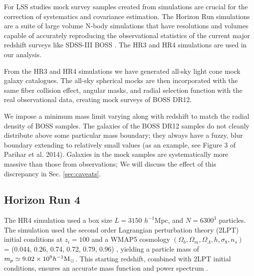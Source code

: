 \documentclass[iop]{emulateapj}
\newcommand{\hMsun}{{\ifmmode{h^{-1}{\rm
        {M_{\odot}}}}\else{$h^{-1}{\rm{M_{\odot}}}$~}\fi}}
\begin{document}

For LSS studies mock survey samples created from simulations are crucial
for the correction of systematics and covariance estimation.
The Horizon Run simulations are a suite of large volume N-body simulations that 
have resolutions and volumes capable of accurately reproducing the observational statistics of the current major redshift surveys like 
SDSS-III BOSS \citep{park 2005,2009ApJ...701.1547K,horizonrun}.
The HR3 \citep{horizonrun} and HR4 \citep{hr4} simulations are used in our analysis.

From the HR3 and HR4 simulations we have generated all-sky light cone mock galaxy catalogues.
The all-sky spherical mocks are then incorporated with the same fiber collision effect, 
angular masks, and radial selection function with the real observational data,
creating mock surveys of BOSS DR12.

We impose a minimum mass limit varying along with redshift to match the radial density of BOSS samples.
The galaxies of the BOSS DR12 samples do not cleanly distribute above some particular mass boundary;
they always have a fuzzy, blur boundary extending to relatively small values (as an example, see Figure 3 of 
Parihar et al. 2014). %
Galaxies in the mock samples are systematically more massive than those from observations;
We will discuss the effect of this discrepancy in Sec. \ref{sec:caveats}.


\subsection{Horizon Run 4}

The HR4 simulation  \citep{hr4} used a box size $L={3150}$ $h^{-1}$Mpc, 
and $N=6300^3$ particles.  
The simulation used the second order Lagrangian perturbation theory (2LPT) initial conditions at $z_{i}=100$ and a WMAP5 cosmology
$(\Omega_{b},\Omega_{m},\Omega_\Lambda,h,\sigma_8,n_s)$  = (0.044, 0.26, 0.74, 0.72, 0.79, 0.96) \citep[]{komatsu 2011}, 
yielding a particle mass of $m_{p} \simeq 9.02 \times 10^9 \hMsun$.
This starting redshift, combined  with 2LPT initial conditions, ensures an accurate mass function and power spectrum \citep{2014NewA...30...79L}. 
\end{document}
